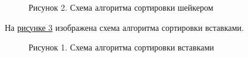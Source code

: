 \documentclass[12pt]{report}
\begin{document}
	\begin{figure}[h!]\label{Schema2}
		\caption*{Рисунок 2. Схема алгоритма сортировки шейкером}
	\end{figure}
	\newpage
	На \hyperref[Schema3]{рисунке 3} изображена схема алгоритма сортировки вставками.
	\begin{figure}[h!]\label{Schema3}
		\caption*{Рисунок 1. Схема алгоритма сортировки вставками}
	\end{figure}
	\newpage
\end{document}
